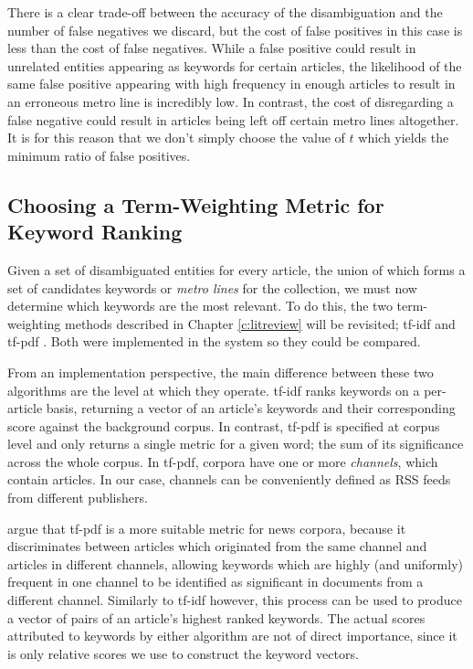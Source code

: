 There is a clear trade-off between the accuracy of the disambiguation and the number of false negatives we discard, but the cost of false positives in this case is less than the cost of false negatives. While a false positive could result in unrelated entities appearing as keywords for certain articles, the likelihood of the same false positive appearing with high frequency in enough articles to result in an erroneous metro line is incredibly low. In contrast, the cost of disregarding a false negative could result in articles being left off certain metro lines altogether. It is for this reason that we don't simply choose the value of $t$ which yields the minimum ratio of false positives.

\subsection{Choosing a Term-Weighting Metric for Keyword Ranking}

Given a set of disambiguated entities for every article, the union of which forms a set of candidates keywords or \textit{metro lines} for the collection, we must now determine which keywords are the most relevant. To do this, the two term-weighting methods described in Chapter \ref{c:litreview} will be revisited; tf-idf \citep{tfidf} and tf-pdf \citep{TopicExtractionfromnewsArchiveUsingTFPDFAlgorithm}. Both were implemented in the system so they could be compared.

From an implementation perspective, the main difference between these two algorithms are the level at which they operate. tf-idf ranks keywords on a per-article basis, returning a vector of an article's keywords and their corresponding score against the background corpus. In contrast, tf-pdf is specified at corpus level and only returns a single metric for a given word; the sum of its significance across the whole corpus. In tf-pdf, corpora have one or more \textit{channels}, which contain articles. In our case, channels can be conveniently defined as RSS feeds from different publishers. 

\citeauthor{TopicExtractionfromnewsArchiveUsingTFPDFAlgorithm} argue that tf-pdf is a more suitable metric for news corpora, because it discriminates between articles which originated from the same channel and articles in different channels, allowing keywords which are highly (and uniformly) frequent in one channel to be identified as significant in documents from a different channel. Similarly to tf-idf however, this process can be used to produce a vector of pairs of an article's highest ranked keywords. The actual scores attributed to keywords by either algorithm are not of direct importance, since it is only relative scores we use to construct the keyword vectors.

